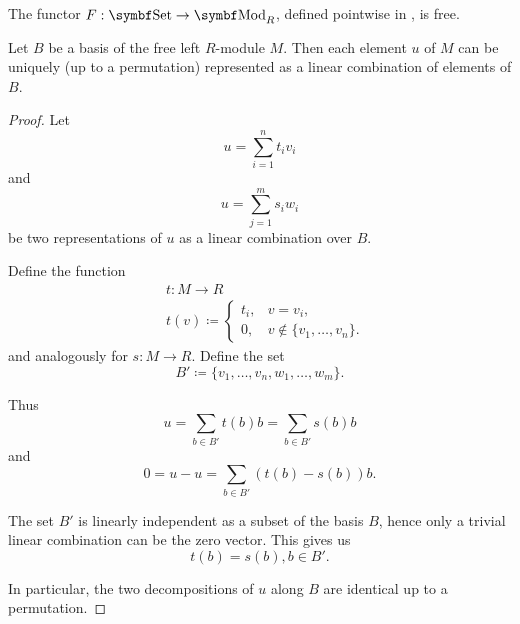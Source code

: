 \begin{proposition}\label{thm:free_module_is_free_functor}
  The functor \( F: \Cat{Set} \to \Cat{Mod}_R \), defined pointwise in , is free.
\end{proposition}

\begin{proposition}\label{def:left_module_basis_decomposition}
  Let \( B \) be a basis of the free left \( R \)-module \( M \). Then each element \( u \) of \( M \) can be uniquely (up to a permutation) represented as a linear combination of elements of \( B \).
\end{proposition}
\begin{proof}
  Let
  \begin{equation*}
    u = \sum_{i=1}^n t_i v_i
  \end{equation*}
  and
  \begin{equation*}
    u = \sum_{j=1}^m s_i w_i
  \end{equation*}
  be two representations of \( u \) as a linear combination over \( B \).

  Define the function
  \begin{align*}
    &t: M \to R \\
    &t(v) \coloneqq \begin{cases}
      t_i, &v = v_i, \\
      0, &v \not\in \{ v_1, \ldots, v_n \}.
    \end{cases}
  \end{align*}
  and analogously for \( s: M \to R \). Define the set
  \begin{equation*}
    B' \coloneqq \{ v_1, \ldots, v_n, w_1, \ldots, w_m \}.
  \end{equation*}

  Thus
  \begin{equation*}
    u = \sum_{b \in B'} t(b) b = \sum_{b \in B'} s(b) b
  \end{equation*}
  and
  \begin{equation*}
    0 = u - u = \sum_{b \in B'} (t(b) - s(b)) b.
  \end{equation*}

  The set \( B' \) is linearly independent as a subset of the basis \( B \), hence only a trivial linear combination can be the zero vector. This gives us
  \begin{equation*}
    t(b) = s(b), b \in B'.
  \end{equation*}

  In particular, the two decompositions of \( u \) along \( B \) are identical up to a permutation.
\end{proof}

